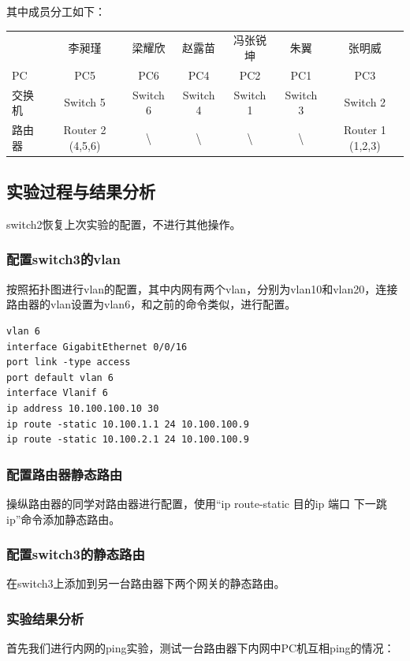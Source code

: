 \documentclass{article}
\begin{document}
其中成员分工如下：

\begin{tabular}{lcccccc}

    & 李昶瑾 & 梁耀欣 & 赵露苗 & 冯张锐坤 & 朱翼 & 张明威 \\

    PC & PC5 & PC6 & PC4 & PC2 & PC1 & PC3 \\
    交换机 & Switch 5 & Switch 6 & Switch 4 & Switch 1 & Switch 3 & Switch 2 \\
    路由器 & Router 2 (4,5,6) & \textbackslash{} & \textbackslash{} & \textbackslash{} & \textbackslash{} & Router 1 (1,2,3) \\

    \end{tabular}

\subsection{实验过程与结果分析}
switch2恢复上次实验的配置，不进行其他操作。
\subsubsection{配置switch3的vlan}
按照拓扑图进行vlan的配置，其中内网有两个vlan，分别为vlan10和vlan20，连接路由器的vlan设置为vlan6，和之前的命令类似，进行配置。
\begin{lstlisting}
vlan 6
interface GigabitEthernet 0/0/16
port link -type access
port default vlan 6
interface Vlanif 6
ip address 10.100.100.10 30
ip route -static 10.100.1.1 24 10.100.100.9
ip route -static 10.100.2.1 24 10.100.100.9
\end{lstlisting}

\subsubsection{配置路由器静态路由}
操纵路由器的同学对路由器进行配置，使用“ip route-static 目的ip 端口 下一跳ip”命令添加静态路由。

\subsubsection{配置switch3的静态路由}
在switch3上添加到另一台路由器下两个网关的静态路由。

\subsubsection{实验结果分析}
首先我们进行内网的ping实验，测试一台路由器下内网中PC机互相ping的情况：
\end{document}

